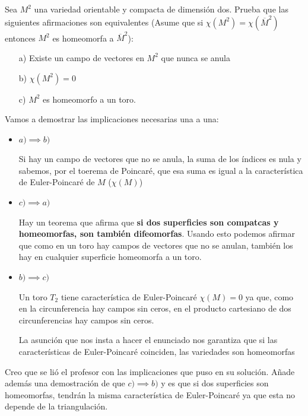 \begin{problem}[3]
Sea $M^2$ una variedad orientable y compacta de dimensión dos. Prueba que las siguientes afirmaciones son equivalentes (Asume que si $\chi(M^2)=\chi(\overline{M}^2)$ entonces $M^2$ es homeomorfa a $\overline{M}^2$):
\begin{enumerate}
\item[a)] Existe un campo de vectores en $M^2$ que nunca se anula

\item[b)] $\chi(M^2)=0$

\item[c)] $M^2$ es homeomorfo a un toro.
\end{enumerate}
\solution


Vamos a demostrar las implicaciones necesarias una a una:
\begin{itemize}
\item $a) \implies b)$

Si hay un campo de vectores que no se anula, la suma de los índices es nula y sabemos, por el toerema de Poincaré, que esa suma es igual a la característica de Euler-Poincaré de $M$ ($\chi (M)$)

\item $c) \implies a)$

Hay un teorema que afirma que \textbf{si dos superficies son compatcas y homeomorfas, son también difeomorfas}. Usando esto podemos afirmar que como en un toro hay campos de vectores que no se anulan, también los hay en cualquier superficie homeomorfa a un toro.

\item $b) \implies c)$

Un toro $T_2$ tiene característica de Euler-Poincaré $\chi (M)=0$ ya que, como en la circunferencia hay campos sin ceros, en el producto cartesiano de dos circunferencias hay campos sin ceros.

La asunción que nos insta a hacer el enunciado nos garantiza que si las características de Euler-Poincaré coinciden, las variedades son homeomorfas

\end{itemize}

Creo que se lió el profesor con las implicaciones que puso en su solución. Añade además una demostración de que $c) \implies b)$ y es que si dos superficies son homeomorfas, tendrán la misma característica de Euler-Poincaré ya que esta no depende de la triangulación.



\end{problem}

